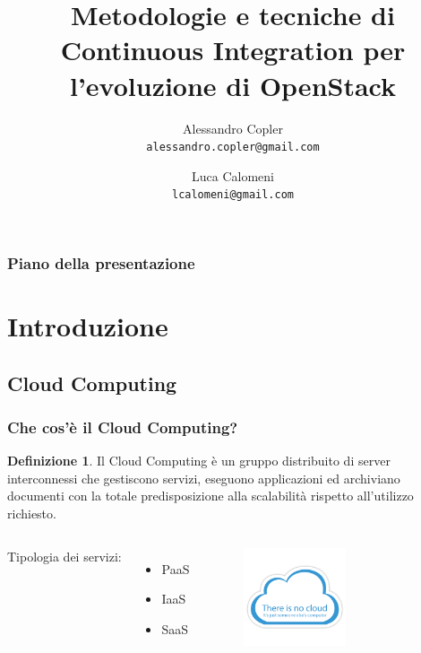 \documentclass{beamer}
\title{Metodologie e tecniche di Continuous Integration per l'evoluzione di OpenStack}
\author[A.Copler e L.Calomeni]{
  Alessandro Copler\\
  \texttt{alessandro.copler@gmail.com}\\
  \and
  Luca Calomeni\\
  \texttt{lcalomeni@gmail.com}
}
\institute[UniDiBergamo]{Università degli studi di Bergamo - Facolta di Ingegneria}
\theoremstyle{definition}
\newtheorem{definizione}{Definizione}
\theoremstyle{plain}
\begin{document}
\begin{frame}
\maketitle
\end{frame}


\begin{frame}
\frametitle{Piano della presentazione}
\tableofcontents
\end{frame}

\section{Introduzione}

\subsection{Cloud
Computing}



\begin{frame}
\frametitle{Che cos'è il Cloud Computing?}
\begin{definizione}

Il \alert{Cloud Computing} è un gruppo distribuito di server interconnessi che gestiscono servizi, eseguono applicazioni ed archiviano documenti con la totale predisposizione alla scalabilità rispetto all'utilizzo richiesto.
\end{definizione}
\begin{columns}
Tipologia dei servizi:
\begin{itemize}
\item
PaaS
\item
IaaS
\item
SaaS
\end{itemize}
\begin{figure}[!h]
	\begin{center}
\includegraphics[width=3cm]{cloud.png}
\end{center}
\end{figure}

\end{columns}

\end{frame}
\end{document}

